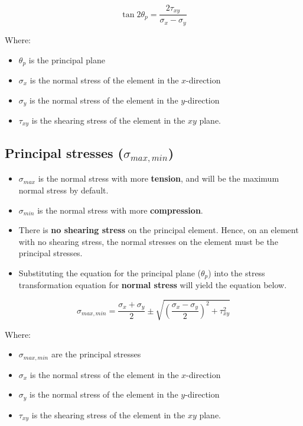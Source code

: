 \documentclass[11pt]{article}
\begin{document}
\[\tan 2 \theta_p = \frac{2 \tau_{xy}}{\sigma_x - \sigma_y}\]

Where:
\begin{itemize}
\item \(\theta_p\) is the principal plane
\item \(\sigma_x\) is the normal stress of the element in the \(x\)-direction
\item \(\sigma_y\) is the normal stress of the element in the \(y\)-direction
\item \(\tau_{xy}\) is the shearing stress of the element in the \(xy\) plane.
\end{itemize}

\newpage

\subsection{Principal stresses (\(\sigma_{max, min}\))}
\label{sec:org7826303}
\begin{itemize}
\item \(\sigma_{max}\) is the normal stress with more \textbf{tension}, and will be the maximum normal stress by default.
\item \(\sigma_{min}\) is the normal stress with more \textbf{compression}.
\item There is \textbf{no shearing stress} on the principal element. Hence, on an element with no shearing stress, the normal stresses on the element must be the principal stresses.
\item Substituting the equation for the principal plane (\(\theta_p\)) into the stress transformation equation for \textbf{normal stress} will yield the equation below.
\end{itemize}

\[\sigma_{max, min} = \frac{\sigma_x + \sigma_y}{2} \pm \sqrt{\left(\frac{\sigma_x - \sigma_y}{2} \right)^2 + \tau_{xy}^2}\]

Where:
\begin{itemize}
\item \(\sigma_{max, min}\) are the principal stresses
\item \(\sigma_x\) is the normal stress of the element in the \(x\)-direction
\item \(\sigma_y\) is the normal stress of the element in the \(y\)-direction
\item \(\tau_{xy}\) is the shearing stress of the element in the \(xy\) plane.
\end{itemize}
\end{document}
